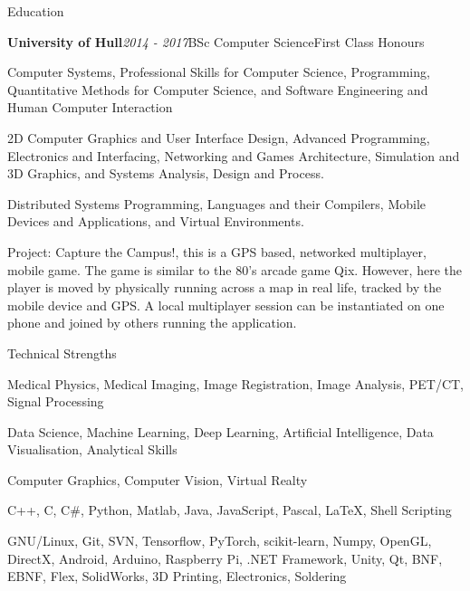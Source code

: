 \documentclass{cv}
\begin{document}
\begin{rSection}{Education}
        \item \begin{rSubsection}{\bf University of Hull}{\em 2014 - 2017}{BSc Computer Science}{First Class Honours}
            \item Computer Systems, Professional Skills for Computer Science, Programming, Quantitative Methods for Computer Science, and Software Engineering and Human Computer Interaction
            
            \item 2D Computer Graphics and User Interface Design, Advanced Programming, Electronics and Interfacing, Networking and Games Architecture, Simulation and 3D Graphics, and Systems Analysis, Design and Process.
            
            \item Distributed Systems Programming, Languages and their Compilers, Mobile Devices and Applications, and Virtual Environments.
            
            \item Project: Capture the Campus!, this is a GPS based, networked multiplayer, mobile game. The game is similar to the 80's arcade game Qix. However, here the player is moved by physically running across a map in real life, tracked by the mobile device and GPS. A local multiplayer session can be instantiated on one phone and joined by others running the application.
        \end{rSubsection}
    \end{rSection}

    \begin{rSection}{Technical Strengths}
        \item Medical Physics, Medical Imaging, Image Registration, Image Analysis, PET/CT, Signal Processing
        \item Data Science, Machine Learning, Deep Learning, Artificial Intelligence, Data Visualisation, Analytical Skills
        \item Computer Graphics, Computer Vision, Virtual Realty
        \item C++, C, C\#, Python, Matlab, Java, JavaScript, Pascal, LaTeX, Shell Scripting
        \item GNU/Linux, Git, SVN, Tensorflow, PyTorch, scikit-learn, Numpy, OpenGL, DirectX, Android, Arduino, Raspberry Pi, .NET Framework, Unity, Qt, BNF, EBNF, Flex, SolidWorks, 3D Printing, Electronics, Soldering 
    \end{rSection}
    
\end{document}
